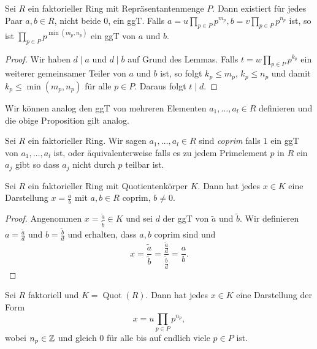 \begin{proposition}[ggT]
	Sei $R$ ein faktorieller Ring mit Repräsentantenmenge $P$.
	Dann existiert für jedes Paar $a,b \in R$, nicht beide $0$,
	ein ggT. Falls $a = u \prod_{p \in P} p^{m_{p}}, b = v \prod_{p \in P} p^{n_{p}}$ ist, so ist
	$\prod_{p \in P} p^{\min(m_{p},n_{p})}$ ein ggT von $a$ und $b$.
\end{proposition}

\begin{proof}
	Wir haben $d \mid a$ und $d \mid b$ auf Grund des Lemmas.
	Falls $t = w \prod_{p \in P} p^{k_{p}}$ ein weiterer gemeinsamer Teiler von $a$ und $b$ ist,
	so folgt $k_{p} \leq m_{p}$, $k_{p} \leq n_{p}$ und damit $k_{p} \leq \min(m_{p}, n_{p})$ für alle $p \in P$.
	Daraus folgt $t \mid d$.
\end{proof}

Wir können analog den ggT von mehreren Elementen $a_1,\ldots, a_{l} \in R$ definieren und die obige Proposition gilt analog.

\begin{definition}
	Sei $R$ ein faktorieller Ring. Wir sagen $a_1,\ldots,a_{l} \in R$ sind \emph{coprim} falls $1$ ein ggT von
	$a_1,\ldots,a_{l}$ ist, oder äquivalenterweise falls es zu jedem Primelement $p$ in $R$ 
	ein $a_{j}$ gibt so dass $a_{j}$ nicht durch $p$ teilbar ist.
\end{definition}

\begin{corollary}
	Sei $R$ ein faktorieller Ring mit Quotientenkörper $K$.
	Dann hat jedes $x \in K$ eine Darstellung $x = \frac{a}{b}$ mit $a,b \in R$ coprim, $b \neq 0$.
\end{corollary}

\begin{proof}
	Angenommen $x = \frac{\widetilde{a}}{\widetilde{b}} \in K$ und sei $d$ der ggT von $\widetilde{a}$ und $\widetilde{b}$.
	Wir definieren $a = \frac{\widetilde{a}}{d}$ und $b = \frac{\widetilde{b}}{d}$ und erhalten, dass $a,b$ coprim
	sind und 
	\[
	x = \frac{\widetilde{a}}{\widetilde{b}} = \frac{\frac{\widetilde{a}}{d}}{\frac{\widetilde{b}}{d}} = \frac{a}{b}
	.\] 
\end{proof}

\begin{corollary}
	Sei $R$ faktoriell und $K = \operatorname{Quot}(R)$. Dann hat jedes $x \in K$ eine Darstellung der Form 
	\[
	x = u \prod_{p \in P} p^{n_{p}}
	,\]
	wobei $n_{p} \in \mathbb{Z}$ und gleich $0$ für alle bis auf endlich viele $p \in P$ ist.
\end{corollary}


